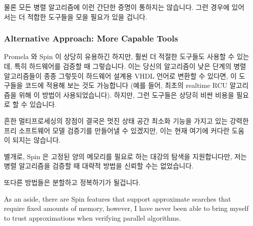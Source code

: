 물론 모든 병렬 알고리즘에 이런 간단한 증명이 통하지는 않습니다.
그런 경우에 있어서는 더 적합한 도구들을 모을 필요가 있을 겁니다.
\iffalse

Of course, not all parallel algorithms have such simple proofs.
In such cases, it may be necessary to enlist more capable tools.
\fi

\subsubsection{Alternative Approach: More Capable Tools}
\label{sec:formal:Alternative Approach: More Capable Tools}

Promela 와 Spin 이 상당히 유용하긴 하지만, 훨씬 더 적절한 도구들도 사용할 수
있는데, 특히 하드웨어를 검증할 때 그렇습니다.
이는 당신의 알고리즘이 낮은 단계의 병렬 알고리즘들이 종종 그렇듯이 하드웨어
설계용 VHDL 언어로 변환할 수 있다면, 이 도구들을 코드에 적용해 보는 것도
가능합니다 (예를 들어, 최초의 realtime RCU 알고리즘을 위해 이 방법이
사용되었습니다).
하지만, 그런 도구들은 상당히 비싼 비용을 필요로 할 수 있습니다.

흔한 멀티프로세싱의 장점이 결국은 멋진 상태 공간 최소화 기능을 가지고 있는
강력한 프리 소프트웨어 모델 검증기를 만들어낼 수 있겠지만, 이는 현재 여기에
커다란 도움이 되지는 않습니다.
\iffalse

Although Promela and Spin are quite useful,
much more capable tools are available, particularly for verifying
hardware.
This means that if it is possible to translate your algorithm
to the hardware-design VHDL language, as it often will be for
low-level parallel algorithms, then it is possible to apply these
tools to your code (for example, this was done for the first
realtime RCU algorithm).
However, such tools can be quite expensive.

Although the advent of commodity multiprocessing
might eventually result in powerful free-software model-checkers
featuring fancy state-space-reduction capabilities,
this does not help much in the here and now.
\fi

별개로, Spin 은 고정된 양의 메모리를 필요로 하는 대강의 탐색을 지원합니다만,
저는 병렬 알고리즘을 검증할 때 대략적 방법을 신뢰할 수는 없었습니다.

또다른 방법들은 분할하고 정복하기가 될겁니다.
\iffalse

As an aside, there are Spin features that support approximate searches
that require fixed amounts of memory, however, I have never been able
to bring myself to trust approximations when verifying parallel
algorithms.

